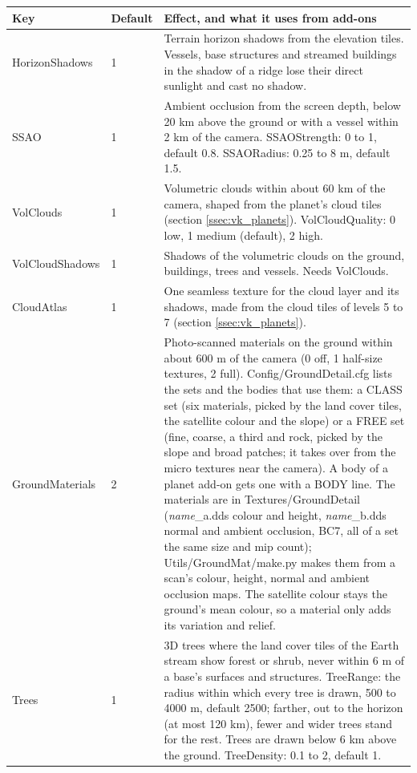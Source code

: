 \documentclass[Orbiter Developer Manual.tex]{subfiles}
\begin{document}
\begin{sloppypar}
	\begin{longtable}{ |p{}|p{}|p{}| }
	\hline\rule{0pt}{2ex}
	\textbf{Key} & \textbf{Default} & \textbf{Effect, and what it uses from add-ons}\\
	\hline\rule{0pt}{2ex}
	HorizonShadows & 1 & Terrain horizon shadows from the elevation tiles. Vessels, base structures and streamed buildings in the shadow of a ridge lose their direct sunlight and cast no shadow.\\
	\hline\rule{0pt}{2ex}
	SSAO & 1 & Ambient occlusion from the screen depth, below 20 km above the ground or with a vessel within 2 km of the camera. SSAOStrength: 0 to 1, default 0.8. SSAORadius: 0.25 to 8 m, default 1.5.\\
	\hline\rule{0pt}{2ex}
	VolClouds & 1 & Volumetric clouds within about 60 km of the camera, shaped from the planet's cloud tiles (section \ref{ssec:vk_planets}). VolCloudQuality: 0 low, 1 medium (default), 2 high.\\
	\hline\rule{0pt}{2ex}
	VolCloudShadows & 1 & Shadows of the volumetric clouds on the ground, buildings, trees and vessels. Needs VolClouds.\\
	\hline\rule{0pt}{2ex}
	CloudAtlas & 1 & One seamless texture for the cloud layer and its shadows, made from the cloud tiles of levels 5 to 7 (section \ref{ssec:vk_planets}).\\
	\hline\rule{0pt}{2ex}
	GroundMaterials & 2 & Photo-scanned materials on the ground within about 600 m of the camera (0 off, 1 half-size textures, 2 full). Config/GroundDetail.cfg lists the sets and the bodies that use them: a CLASS set (six materials, picked by the land cover tiles, the satellite colour and the slope) or a FREE set (fine, coarse, a third and rock, picked by the slope and broad patches; it takes over from the micro textures near the camera). A body of a planet add-on gets one with a BODY line. The materials are in Textures/GroundDetail (\textit{name}\_a.dds colour and height, \textit{name}\_b.dds normal and ambient occlusion, BC7, all of a set the same size and mip count); Utils/GroundMat/make.py makes them from a scan's colour, height, normal and ambient occlusion maps. The satellite colour stays the ground's mean colour, so a material only adds its variation and relief.\\
	\hline\rule{0pt}{2ex}
	Trees & 1 & 3D trees where the land cover tiles of the Earth stream show forest or shrub, never within 6 m of a base's surfaces and structures. TreeRange: the radius within which every tree is drawn, 500 to 4000 m, default 2500; farther, out to the horizon (at most 120 km), fewer and wider trees stand for the rest. Trees are drawn below 6 km above the ground. TreeDensity: 0.1 to 2, default 1.\\

\end{longtable}
\end{sloppypar}
\end{document}
